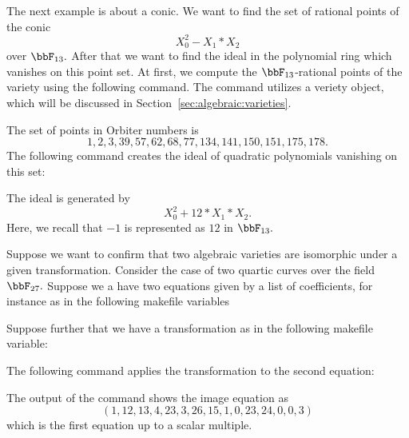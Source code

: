 \bigskip


The next example is about a conic. We want to find the set of rational points of the conic 
$$
X_0^2-X_1*X_2
$$ 
over $\bbF_{13}.$ After that we want to find the ideal in the polynomial ring which vanishes on this point set. 
At first, we compute the $\bbF_{13}$-rational points of the variety using the following command. The command utilizes a 
veriety object, which will be discussed in Section~\ref{sec:algebraic:varieties}.



\bigskip

The set of points in Orbiter numbers is 
$$
1, 2, 3, 39, 57, 62, 68, 77, 134, 141, 150, 151, 175, 178.
$$
The following command creates the ideal of quadratic polynomials vanishing on this set:



The ideal is generated by  
$$
X_0^2 + 12*X_1*X_2.
$$
Here, we recall that $-1$ is represented as $12$ in $\bbF_{13}.$



\bigskip


Suppose we want to confirm that two algebraic varieties are isomorphic under a given transformation. 
Consider the case of two quartic curves over the field $\bbF_{27}.$
Suppose we a have two equations given by a list of coefficients, 
for instance as in the following makefile variables





Suppose further that we have a transformation as in the following 
makefile variable:


The following command applies the transformation to the second equation:



The output of the command shows the image equation as
$$
( 1, 12, 13, 4, 23, 3, 26, 15, 1, 0, 23, 24, 0, 0, 3 )
$$
which is the first equation up to a scalar multiple.

\bigskip







